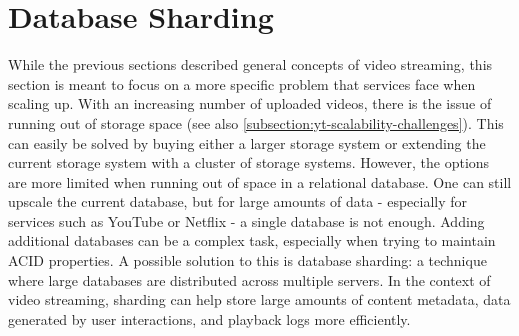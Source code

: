 \begin{table}[h]
    \centering
    \caption{Comparison of In-House Storage, Cloud Storage and \ac{P2P} for Video Streaming}
    \label{tab:comparison_storage_delivery}
\end{table}

\section{Database Sharding}\label{section:db-sharding}
While the previous sections described general concepts of video streaming, this section is meant to focus on a more specific problem that services face when scaling up. 
With an increasing number of uploaded videos, there is the issue of running out of storage space (see also \autoref{subsection:yt-scalability-challenges}). This can easily be solved by buying either a larger storage system or extending the current storage system with a cluster of storage systems. However, the options are more limited when running out of space in a relational database. One can still upscale the current database, but for large amounts of data - especially for services such as YouTube or Netflix - a single database is not enough. Adding additional databases can be a complex task, especially when trying to maintain \ac{ACID} properties. 
A possible solution to this is database sharding: a technique where large databases are distributed across multiple servers. In the context of video streaming, sharding can help store large amounts of content metadata, data generated by user interactions, and playback logs more efficiently.

